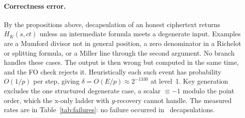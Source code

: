 \paragraph{Correctness error.} By the propositions above, decapsulation of an
honest ciphertext returns $H_K(s,\mathit{ct})$ unless an intermediate formula
meets a degenerate input. Examples are a Mumford divisor not in general
position, a zero denominator in a Richelot or splitting formula, or a Miller
line through the second argument. No branch handles these cases. The output
is then wrong but computed in the same time, and the FO check rejects it.
Heuristically each such event has probability $O(1/p)$ per step, giving
$\delta=O(E/p)\approx2^{-1330}$ at level~1. Key generation excludes the one
structured degenerate case, a scalar $\equiv-1$ modulo the point order, which
the x-only ladder with $y$-recovery cannot handle. The measured rates are in
Table~\ref{tab:failures}: no failure occurred in \FailTotalTrials\
decapsulations.
